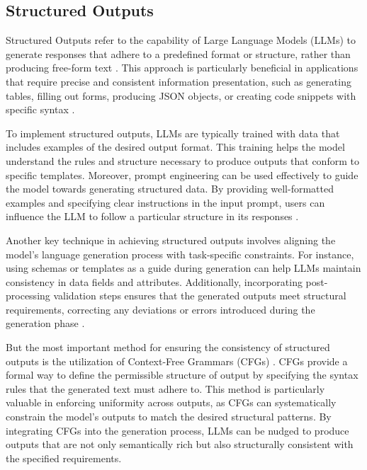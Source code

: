 \subsection{Structured Outputs}

Structured Outputs refer to the capability of Large Language Models (LLMs) to generate responses that adhere to a predefined format or structure, rather than producing free-form text \cite{willardEfficientGuidedGeneration2023}. This approach is particularly beneficial in applications that require precise and consistent information presentation, such as generating tables, filling out forms, producing JSON objects, or creating code snippets with specific syntax \cite{shortenStructuredRAGJSONResponse2024}.

To implement structured outputs, LLMs are typically trained with data that includes examples of the desired output format. This training helps the model understand the rules and structure necessary to produce outputs that conform to specific templates. Moreover, prompt engineering can be used effectively to guide the model towards generating structured data. By providing well-formatted examples and specifying clear instructions in the input prompt, users can influence the LLM to follow a particular structure in its responses \cite{shortenStructuredRAGJSONResponse2024, liuWeNeedStructured2024}.

Another key technique in achieving structured outputs involves aligning the model's language generation process with task-specific constraints. For instance, using schemas or templates as a guide during generation can help LLMs maintain consistency in data fields and attributes. Additionally, incorporating post-processing validation steps ensures that the generated outputs meet structural requirements, correcting any deviations or errors introduced during the generation phase \cite{shortenStructuredRAGJSONResponse2024}.

But the most important method for ensuring the consistency of structured outputs is the utilization of Context-Free Grammars (CFGs) \cite{willardEfficientGuidedGeneration2023}. CFGs provide a formal way to define the permissible structure of output by specifying the syntax rules that the generated text must adhere to. This method is particularly valuable in enforcing uniformity across outputs, as CFGs can systematically constrain the model’s outputs to match the desired structural patterns. By integrating CFGs into the generation process, LLMs can be nudged to produce outputs that are not only semantically rich but also structurally consistent with the specified requirements.

